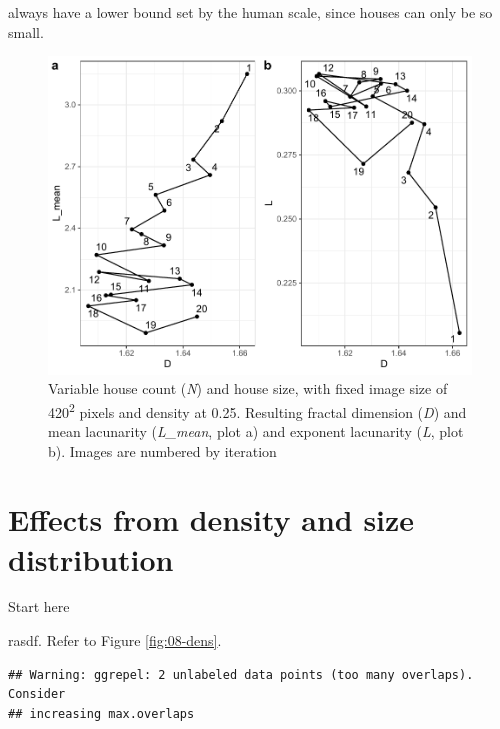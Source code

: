 \documentclass[
  12pt,
]{book}
\begin{document}
always have a lower bound set by the human scale, since houses can only be so small.



\begin{figure}

{\centering \includegraphics[width=0.9\linewidth]{bookdown-demo_files/figure-latex/08-N-HS-1} 

}

\caption{Variable house count (\emph{N}) and house size, with fixed image size of 420\textsuperscript{2} pixels and density at 0.25. Resulting fractal dimension (\emph{D}) and mean lacunarity (\emph{L\_mean}, plot a) and exponent lacunarity (\emph{L}, plot b). Images are numbered by iteration}\label{fig:08-N-HS}
\end{figure}

\FloatBarrier

\hypertarget{effects-from-density-and-size-distribution}{%
\section{Effects from density and size distribution}\label{effects-from-density-and-size-distribution}}

Start here

rasdf. Refer to Figure \ref{fig:08-dens}.



\begin{verbatim}
## Warning: ggrepel: 2 unlabeled data points (too many overlaps). Consider
## increasing max.overlaps
\end{verbatim}
\end{document}
